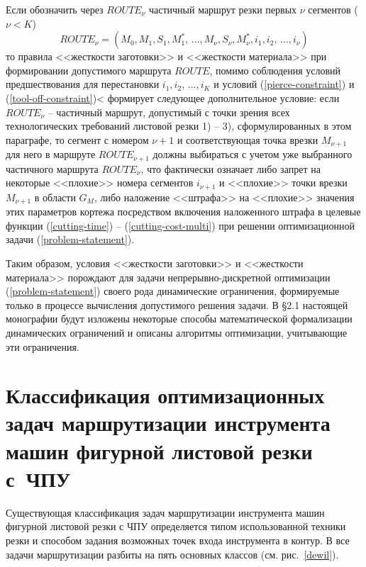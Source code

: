 \documentclass[11pt,twoside,openany]{report}
\newcounter{lem}
\begin{document}
Если обозначить через
$ROUTE_\nu$
частичный маршрут резки первых $\nu$
сегментов
($\nu < K$)
\begin{equation}
  ROUTE_\nu = (M_0, M_1, S_1, M_1^*, \,\dots, M_\nu, S_\nu, M_\nu^*,
  i_1, i_2, \,\dots, i_\nu)
\end{equation}
то правила <<жесткости заготовки>> и <<жесткости материала>>
при формировании допустимого маршрута
$ROUTE$,
помимо соблюдения условий предшествования для перестановки
$i_1, i_2, \,\dots, i_K$
и условий (\ref{pierce-constraint}) и (\ref{tool-off-constraint})<
формирует следующее дополнительное условие:
если
$ROUTE_\nu$ -- частичный маршрут,
допустимый с точки зрения всех технологических
требований листовой резки 1) -- 3),
сформулированных в этом параграфе,
то сегмент с номером $\nu+1$
и соответствующая точка врезки $M_{\nu+1}$
для него в маршруте
$ROUTE_{\nu+1}$
должны выбираться с учетом уже выбранного частичного маршрута
$ROUTE_\nu$,
что фактически означает либо запрет
на некоторые <<плохие>> номера сегментов
$i_{\nu+1}$
и <<плохие>> точки врезки
$M_{\nu+1}$
в области  $G_M$,
либо наложение <<штрафа>> на <<плохие>> значения
этих параметров кортежа
посредством включения наложенного штрафа в целевые функции
(\ref{cutting-time}) -- (\ref{cutting-cost-multi})
при решении оптимизационной задачи (\ref{problem-statement}).

Таким образом,
условия <<жесткости заготовки>> и <<жесткости материала>>
порождают для задачи непрерывно-дискретной оптимизации (\ref{problem-statement})
своего рода динамические ограничения,
формируемые только в процессе вычисления допустимого решения задачи.
В \S 2.1
настоящей монографии будут изложены
некоторые способы математической формализации динамических ограничений
и описаны алгоритмы оптимизации,
учитывающие эти ограничения.

\section{
  Классификация оптимизационных задач
  маршрутизации инструмента
  машин фигурной листовой резки с~ЧПУ
}
\label{sect:1.4}

Существующая  классификация задач маршрутизации инструмента
машин фигурной листовой резки с ЧПУ определяется
типом использованной техники резки и способом задания
возможных точек входа инструмента в контур.
В \cite{intro13}
все задачи маршрутизации разбиты на пять основных классов
(см. рис.~\ref{dewil}).
\end{document}
